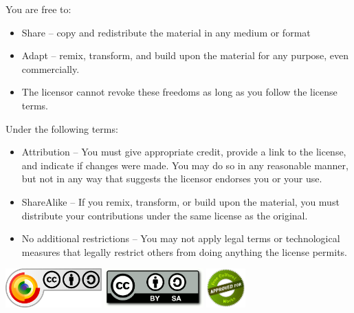 You are free to:
\begin{itemize}
\item Share -- copy and redistribute the material in any medium or format
\item Adapt -- remix, transform, and build upon the material for any purpose, even commercially.
\item The licensor cannot revoke these freedoms as long as you follow the license terms.
\end{itemize}
Under the following terms:
\begin{itemize}
\item Attribution -- You must give appropriate credit, provide a link to the license, and indicate if changes were made. You may do so in any reasonable manner, but not in any way that suggests the licensor endorses you or your use.
\item ShareAlike -- If you remix, transform, or build upon the material, you must distribute your contributions under the same license as the original.
\item No additional restrictions -- You may not apply legal terms or technological measures that legally restrict others from doing anything the license permits.
\end{itemize}

\begin{center}
\includegraphics[height=1.5cm]{License/CC-BY-SA.png}  
\includegraphics[height=1.5cm]{License/CreativeCommons.png}  
\includegraphics[height=1.5cm]{License/FreeCulturalWorks.png}
\end{center}